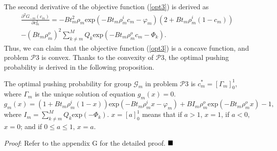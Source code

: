 \documentclass[12pt, draftclsnofoot, onecolumn]{IEEEtran}
\begin{document}
The second derivative of the objective function (\ref{opt3}) is derived as
\begin{eqnarray} \label{2rd}
\frac{\partial^2 G_{-m}(c_m) }{\partial c_m^2}
= - B t_m^2 \rho_m \textrm{exp}(-B t_m \rho_m^i c_m - \varphi_m) (2+ B t_m\rho_m^i (1- c_m)) \nonumber \\
- (B t_m \rho_m^o)^2 \sum_{k \neq m}^M Q_k \textrm{exp}(-B t_m \rho_m^o c_m - \Phi_k).
\end{eqnarray}
Thus, we can claim that the objective function (\ref{opt3}) is a concave function, and problem $\mathcal{P}3$ is convex. Thanks to the convexity of $ \mathcal{P}3$, the optimal pushing probability is derived in the following proposition.

\begin{proposition}\label{Theorem6}
The optimal pushing probability for group $\mathcal{G}_m$ in problem $\mathcal{P}3$ is $c_m^{\ast}=[\Gamma_m]^1_0$, where $\Gamma_m$ is the unique solution of equation $g_m(x) =0$.
\begin{equation}
g_m(x) = (1+ B t_m \rho_m^i (1-x)) \textrm{exp}({-B t_m \rho_m^i x - \varphi_m})
+ B I_m \rho_m^o\textrm{exp}(-{B t_m \rho_m^o x}) -1,
\end{equation}
where $I_m=\sum_{k \neq m}^M Q_k \textrm{exp}(- \Phi_k)$. $x=[a]^1_0$ means that if $a>1$, $x=1$, if $a<0$, $x=0$; and if $0\leq a \leq 1$, $x=a$.
\end{proposition}
\textit{Proof}: Refer to the appendix G for the detailed proof.
$\hfill\blacksquare$
\end{document}
